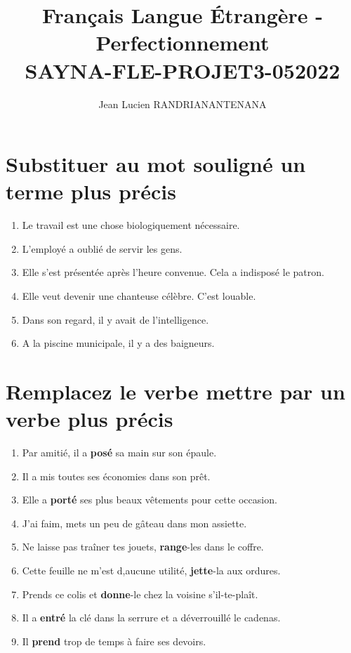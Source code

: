 \documentclass[12pt]{article}
\author{Jean Lucien RANDRIANANTENANA}
\title{Français Langue
Étrangère - Perfectionnement\\SAYNA-FLE-PROJET3-052022}
\newcommand{\colo}[1]{{\color{blue}\textbf{#1}}}
\begin{document}
\maketitle
\tableofcontents
\newpage
\section{Substituer au mot souligné un terme plus précis}
\begin{enumerate}
	 \item Le travail est une chose biologiquement nécessaire. \item L’employé a oublié de servir les gens. \item Elle s’est présentée après l’heure convenue. Cela a indisposé le patron. \item Elle veut devenir une chanteuse célèbre. C’est louable. \item Dans son regard, il y avait de l’intelligence. \item A la piscine municipale, il y a des baigneurs.
\end{enumerate}

\section{Remplacez le verbe mettre par un verbe plus précis} 
\begin{enumerate}
	\item Par amitié, il a \colo{posé} sa main sur son épaule. 
	\item Il a mis toutes ses \og{}économies dans son prêt\fg{}. 
	\item Elle a \colo{porté} ses plus beaux vêtements pour cette occasion. 
	\item J’ai faim, mets un peu de gâteau dans mon assiette.
	\item Ne laisse pas traîner tes jouets, \colo{range}-les dans le coffre. 
	\item Cette feuille ne m’est d,aucune utilité, \colo{jette}-la aux ordures. 
	\item Prends ce colis et \colo{donne}-le chez la voisine s’il-te-plaît. 
	\item Il a \colo{entré} la clé dans la serrure et a déverrouillé le cadenas. 
	\item Il \colo{prend} trop de temps à faire ses devoirs.
\end{enumerate}
\end{document}
